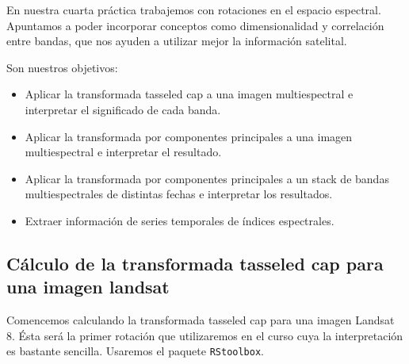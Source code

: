En nuestra cuarta pr\'actica trabajemos con rotaciones en el espacio espectral.
Apuntamos a poder incorporar conceptos como dimensionalidad y
correlaci\'on entre bandas, que nos ayuden a utilizar mejor la informaci\'on
satelital.

Son nuestros objetivos:

\begin{itemize}
    \item Aplicar la transformada tasseled cap a una imagen multiespectral e
        interpretar el significado de cada banda.
    \item Aplicar la transformada por componentes principales a una imagen
        multiespectral e interpretar el resultado.
    \item Aplicar la transformada por componentes principales a un stack
        de bandas multiespectrales de distintas fechas e interpretar los resultados.
    \item Extraer informaci\'on de series temporales de \'indices espectrales.
\end{itemize}

\subsection{C\'alculo de la transformada tasseled cap para una imagen landsat}

Comencemos calculando la transformada tasseled cap para una imagen Landsat 8. \'Esta
ser\'a la primer rotaci\'on que utilizaremos en el curso cuya la
interpretaci\'on es bastante sencilla. Usaremos el paquete
\texttt{RStoolbox}.


